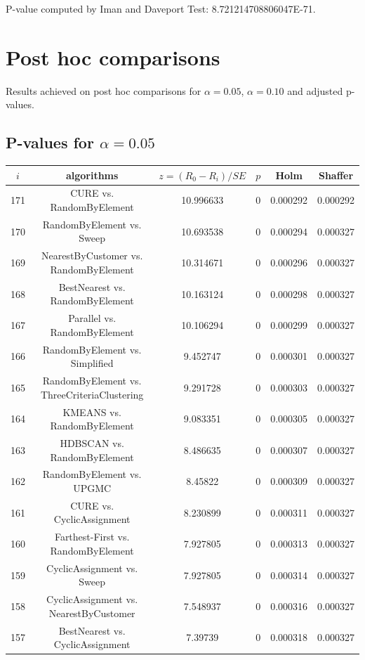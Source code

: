 \documentclass[a4paper,10pt]{article}
\begin{document}
\begin{landscape}
P-value computed by Iman and Daveport Test: 8.721214708806047E-71.\newline



\pagebreak

\section{Post hoc comparisons}

Results achieved on post hoc comparisons for $\alpha = 0.05$, $\alpha = 0.10$ and adjusted p-values.

\subsection{P-values for $\alpha=0.05$}

\begin{table}[!htp]
\centering\scriptsize
\begin{tabular}{cccccc}
$i$&algorithms&$z=(R_0 - R_i)/SE$&$p$&Holm&Shaffer\\
\hline171&CURE vs. RandomByElement&10.996633&0&0.000292&0.000292\\
170&RandomByElement vs. Sweep&10.693538&0&0.000294&0.000327\\
169&NearestByCustomer vs. RandomByElement&10.314671&0&0.000296&0.000327\\
168&BestNearest vs. RandomByElement&10.163124&0&0.000298&0.000327\\
167&Parallel vs. RandomByElement&10.106294&0&0.000299&0.000327\\
166&RandomByElement vs. Simplified&9.452747&0&0.000301&0.000327\\
165&RandomByElement vs. ThreeCriteriaClustering&9.291728&0&0.000303&0.000327\\
164&KMEANS vs. RandomByElement&9.083351&0&0.000305&0.000327\\
163&HDBSCAN vs. RandomByElement&8.486635&0&0.000307&0.000327\\
162&RandomByElement vs. UPGMC&8.45822&0&0.000309&0.000327\\
161&CURE vs. CyclicAssignment&8.230899&0&0.000311&0.000327\\
160&Farthest-First vs. RandomByElement&7.927805&0&0.000313&0.000327\\
159&CyclicAssignment vs. Sweep&7.927805&0&0.000314&0.000327\\
158&CyclicAssignment vs. NearestByCustomer&7.548937&0&0.000316&0.000327\\
157&BestNearest vs. CyclicAssignment&7.39739&0&0.000318&0.000327\\

\end{tabular}
\end{table}
\end{landscape}
\end{document}
